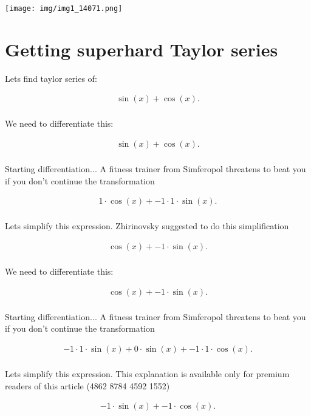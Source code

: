 \documentclass[12pt,a4paper]{extreport}
\begin{document}
\texttt{[image: img/img1\_14071.png]}
\section{Getting superhard Taylor series}

Lets find taylor series of:


\begin{multline}
\sin(x) + \cos(x).\\
\end{multline}


We need to differentiate this:


\begin{multline}
\sin(x) + \cos(x).\\
\end{multline}


Starting differentiation... 
A fitness trainer from Simferopol\cite{SJ} threatens to beat you if you don't continue the transformation 

\begin{multline}
1 \cdot \cos(x) + -1 \cdot 1 \cdot \sin(x).\\
\end{multline}


Lets simplify this expression.
Zhirinovsky suggested \cite{Zhirinovsky} to do this simplification 

\begin{multline}
\cos(x) + -1 \cdot \sin(x).\\
\end{multline}


We need to differentiate this:


\begin{multline}
\cos(x) + -1 \cdot \sin(x).\\
\end{multline}


Starting differentiation... 
A fitness trainer from Simferopol\cite{SJ} threatens to beat you if you don't continue the transformation 

\begin{multline}
-1 \cdot 1 \cdot \sin(x) + 0 \cdot \sin(x) + -1 \cdot 1 \cdot \cos(x).\\
\end{multline}


Lets simplify this expression.
This explanation is available only for premium readers of this article (4862 8784 4592 1552) 

\begin{multline}
-1 \cdot \sin(x) + -1 \cdot \cos(x).\\
\end{multline}
\end{document}
